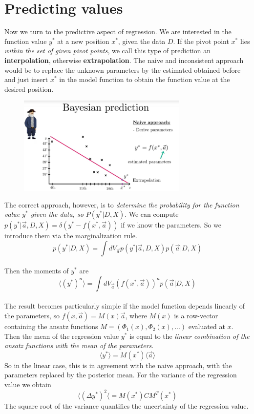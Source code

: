 \documentclass[12pt, a4paper]{scrartcl}
\begin{document}
\section*{Predicting values}
Now we turn to the predictive aspect of regression. We are interested in the
function value $y^*$ at a new position $x^*$, given the data $D$. If the pivot point
$x^*$ lies \textit{within the set of given pivot points}, we call this type of prediction an
\textbf{interpolation}, otherwise \textbf{extrapolation}. The naive and inconsistent approach
would be to replace the unknown parameters by the estimated obtained before 
and just insert $x^*$ in the model function to obtain the function value
at the desired position. \\%
\begin{figure}[H]
	\centering
	\includegraphics[width=0.75\textwidth]{7_8.png}
\end{figure}
The correct approach, however, is to \textit{determine the probability for the function 
value $y^*$ given the data, so $P(y^*|D,X)$}.
We can compute $p(y^*|\vec{a},D,X)=\delta(y^*-f(x^*,\vec{a}))$ if we know the parameters. So we introduce
them via the marginalization rule.%
\begin{equation*}\boxed{p(y^*|D,X)=\int dV_{\vec{a}}p(y^*|\vec{a},D,X)p(\vec{a}|D,X)
}\end{equation*}\\
 Then the moments of $y^*$ are 
 \begin{equation*}\boxed{\langle (y^*)^n\rangle=\int dV_{\vec{a}}(f(x^*,\vec{a}))^np(\vec{a}|D,X)
}\end{equation*}\\
The result becomes particularly simple if the model function depends
linearly of the parameters, so $f(x,\vec{a})=M(x)\vec{a}$, where $M(x)$ is a row-vector containing the ansatz functions $M=(\Phi_1(x),\Phi_2(x),...)$
evaluated at $x$. Then the mean of the regression value $y^*$ is equal to the \textit{linear combination
of the ansatz functions with the mean of the parameters}.
\[\langle y^*\rangle = M(x^*)\langle \vec{a}\rangle\]
So in the linear case, this is in agreement with the naive approach, with the
parameters replaced by the posterior mean.
For the variance of the regression value we obtain
\[\langle (\Delta y^*)^2\langle = M(x^*)CM^T(x^*)\]
The square root of the variance quantifies the uncertainty of the regression
value.\\%
\end{document}
